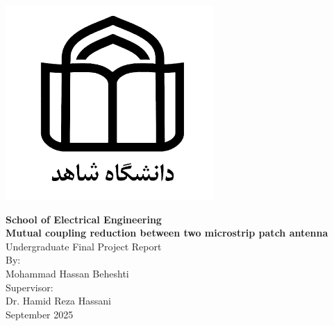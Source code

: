\newpage
\thispagestyle{empty}
\vspace*{-28mm}

\centerline{\includegraphics[scale=0.5]{./Images/general/logo_en.png}}
\begin{latin}
\begin{center}
\large
\vspace{-1mm}
\textbf{School of Electrical Engineering}
\\[3cm]
\textbf{Mutual coupling reduction between two microstrip patch antenna}
\\[1.5cm]
Undergraduate Final Project Report
\\[4cm]
By: 
\\[0.5cm]
Mohammad Hassan Beheshti
\\[1cm]
Supervisor:
\\[0.5cm]
Dr. Hamid Reza Hassani
\\[2cm]
September 2025

\end{center}
\end{latin}